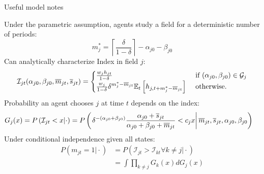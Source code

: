 \documentclass[compress, 8pt]{beamer}
\begin{document}
\begin{frame}{Useful model notes}\label{id_model_notes}

Under the parametric assumption, agents study a field for a deterministic number of periods: \ \hyperlink{sim_parameterization}{}
\begin{equation*}
    m_{j}^* = \left\lceil{\frac{\delta}{1 - \delta}}\right\rceil - \alpha_{j0} - \beta_{j0}
\end{equation*}
Can analytically characterize Index in field $j$:
\begin{equation*}
    \mathcal{I}_{jt} (\alpha_{j0}, \beta_{j0}, \overline{m}_{jt}, \overline{s}_{jt}) = \begin{cases}
    \frac{w_j h_{jt}}{1 - \delta} &\text{ if } (\alpha_{j0}, \beta_{j0}) \in \mathcal{G}_j \\
    \frac{w_j}{1 - \delta} \delta^{m_j^* - \overline{m}_{jt}} \mathbb{E}_t \left[ h_{j, t + m_j^* - \overline{m}_{jt}} \right] &\text{ otherwise}.
    \end{cases}
\end{equation*}
Probability an agent chooses $j$ at time $t$ depends on the index:
\begin{align*}
    G_j (x) = P \left( \mathcal{I}_{jt} < x \vert \cdot \right) 
    &= P \left( \left. 
        \delta^{-(\alpha_{j0} + \beta_{j0})} 
        \frac{\alpha_{j0} + \overline{s}_{jt}}{\alpha_{j0} + \beta_{j0} + \overline{m}_{jt}}
        < c_j x
     \right\vert
    \overline{m}_{jt}, \overline{s}_{jt}, \alpha_{j0}, \beta_{j0}
     \right)
\end{align*}
Under conditional independence given all states:
\begin{align*}
    P(m_{jt} = 1 \vert \cdot) &= P(\mathcal{I}_{jt} > \mathcal{I}_{kt} \forall k \neq j \vert \cdot) \\
    &= \int \prod_{k \neq j} G_k (x) d G_j (x)
\end{align*}
\hyperlink{model_optimal_rule}{}

\end{frame}



\end{document}
